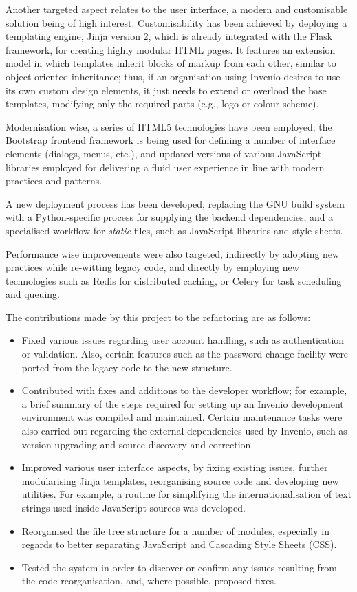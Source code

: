 Another targeted aspect relates to the user interface, a modern and
customisable solution being of high interest. Customisability has been achieved
by deploying a templating engine, Jinja version 2, which is already integrated
with the Flask framework, for creating highly modular HTML pages. It features
an extension model in which templates inherit blocks of markup from each other,
similar to object oriented inheritance; thus, if an organisation using Invenio
desires to use its own custom design elements, it just needs to extend or
overload the base templates, modifying only the required parts (e.g., logo or
colour scheme).

Modernisation wise, a series of HTML5 technologies have been employed; the
Bootstrap \cite{ref:bootstrap} frontend framework is being used for defining a
number of interface elements (dialogs, menus, etc.), and updated versions of
various JavaScript libraries employed for delivering a fluid user experience in
line with modern practices and patterns.

A new deployment process has been developed, replacing the GNU build system
with a Python-specific process for supplying the backend dependencies, and a
specialised workflow for \textit{static} files, such as JavaScript libraries
and style sheets.

Performance wise improvements were also targeted, indirectly by adopting new
practices while re-witting legacy code, and directly by employing new
technologies such as Redis \cite{ref:redis} for distributed caching, or Celery
\cite{ref:celery} for task scheduling and queuing.

The contributions made by this project to the refactoring are as follows:
\begin{itemize}
  \item Fixed various issues regarding user account handling, such as
        authentication or validation. Also, certain features such as the
        password change facility were ported from the legacy code to the new
        structure.
  \item Contributed with fixes and additions to the developer workflow; for
        example, a brief summary of the steps required for setting up an Invenio
        development environment was compiled and maintained. Certain
        maintenance tasks were also carried out regarding the external
        dependencies used by Invenio, such as version upgrading and source
        discovery and correction.
  \item Improved various user interface aspects, by fixing existing issues,
        further modularising Jinja templates, reorganising source code and
        developing new utilities. For example, a routine for simplifying the
        internationalisation of text strings used inside JavaScript sources
        was developed.
  \item Reorganised the file tree structure for a number of modules, especially
        in regards to better separating JavaScript and Cascading Style Sheets
        (CSS).
  \item Tested the system in order to discover or confirm any issues resulting
        from the code reorganisation, and, where possible, proposed fixes.
\end{itemize}

